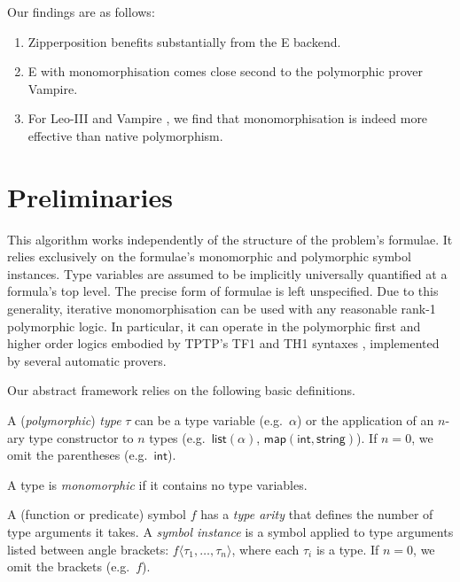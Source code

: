 \documentclass[]{ceurart}
\newcommand\ty[1]{\textsf{#1}}
\begin{document}
Our findings are as follows:
\begin{enumerate}
\item Zipperposition benefits substantially from the E backend.

\item E with monomorphisation comes close second to the polymorphic prover Vampire.

\item For Leo-III \cite{leo-iii} and Vampire \cite{vamp}, we find that monomorphisation is indeed more effective than native polymorphism.
\end{enumerate}

\section{Preliminaries}
\label{sec:preliminaries}

This algorithm works independently of the structure of the problem's formulae. It relies exclusively on the formulae's monomorphic and polymorphic symbol instances. Type variables are assumed to be implicitly universally quantified at a formula's top level. The precise form of formulae is left unspecified.
Due to this generality, iterative monomorphisation can be used with any reasonable rank-1 polymorphic logic. In particular, it can operate in the polymorphic first and higher order logics embodied by TPTP's TF1 and TH1 syntaxes \cite{blanchette-paskevich-2013,th1}, implemented by several automatic provers.


Our abstract framework relies on the following basic definitions.

\begin{definition}
A (\emph{polymorphic}) \emph{type} \(\tau\) can be a type variable (e.g.\ \(\alpha\)) or
the application of an \(n\)-ary type constructor to \(n\) types (e.g.\ \(\ty{list}(\alpha)\), \(\ty{map}(\ty{int},\ty{string})\)).
If $n = 0$, we omit the parentheses (e.g.\ \(\ty{int}\)).
\end{definition}

\begin{definition}
A type is \emph{monomorphic} if it contains no type variables.
\end{definition}

\begin{definition}
A (function or predicate) {symbol} \(f\) has a \emph{type arity} that defines the number of type arguments it takes. A \emph{symbol instance} is a symbol applied to type arguments listed between angle brackets: \(f\langle \tau_1, \dots, \tau_n\rangle\), where each $\tau_i$ is a type. If $n = 0$, we omit the brackets (e.g.\ $f$).
\end{definition}
\end{document}
